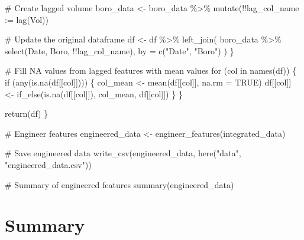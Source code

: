 \documentclass[
  letterpaper,
  DIV=11,
  numbers=noendperiod]{scrreprt}
\newenvironment{Shaded}{\begin{snugshade}}{\end{snugshade}}
\newcommand{\AttributeTok}[1]{\textcolor[rgb]{0.40,0.45,0.13}{#1}}
\newcommand{\CommentTok}[1]{\textcolor[rgb]{0.37,0.37,0.37}{#1}}
\newcommand{\ConstantTok}[1]{\textcolor[rgb]{0.56,0.35,0.01}{#1}}
\newcommand{\ControlFlowTok}[1]{\textcolor[rgb]{0.00,0.23,0.31}{#1}}
\newcommand{\FunctionTok}[1]{\textcolor[rgb]{0.28,0.35,0.67}{#1}}
\newcommand{\NormalTok}[1]{\textcolor[rgb]{0.00,0.23,0.31}{#1}}
\newcommand{\OtherTok}[1]{\textcolor[rgb]{0.00,0.23,0.31}{#1}}
\newcommand{\SpecialCharTok}[1]{\textcolor[rgb]{0.37,0.37,0.37}{#1}}
\newcommand{\StringTok}[1]{\textcolor[rgb]{0.13,0.47,0.30}{#1}}
\begin{document}
\begin{Shaded}
\begin{Highlighting}[]
    \CommentTok{\# Create lagged volume}
\NormalTok{    boro\_data }\OtherTok{\textless{}{-}}\NormalTok{ boro\_data }\SpecialCharTok{\%\textgreater{}\%}
      \FunctionTok{mutate}\NormalTok{(}\SpecialCharTok{!!}\AttributeTok{lag\_col\_name :=} \FunctionTok{lag}\NormalTok{(Vol))}
    
    \CommentTok{\# Update the original dataframe}
\NormalTok{    df }\OtherTok{\textless{}{-}}\NormalTok{ df }\SpecialCharTok{\%\textgreater{}\%}
      \FunctionTok{left\_join}\NormalTok{(}
\NormalTok{        boro\_data }\SpecialCharTok{\%\textgreater{}\%} \FunctionTok{select}\NormalTok{(Date, Boro, }\SpecialCharTok{!!}\NormalTok{lag\_col\_name),}
        \AttributeTok{by =} \FunctionTok{c}\NormalTok{(}\StringTok{"Date"}\NormalTok{, }\StringTok{"Boro"}\NormalTok{)}
\NormalTok{      )}
\NormalTok{  \}}
  
  \CommentTok{\# Fill NA values from lagged features with mean values}
  \ControlFlowTok{for}\NormalTok{ (col }\ControlFlowTok{in} \FunctionTok{names}\NormalTok{(df)) \{}
    \ControlFlowTok{if}\NormalTok{ (}\FunctionTok{any}\NormalTok{(}\FunctionTok{is.na}\NormalTok{(df[[col]]))) \{}
\NormalTok{      col\_mean }\OtherTok{\textless{}{-}} \FunctionTok{mean}\NormalTok{(df[[col]], }\AttributeTok{na.rm =} \ConstantTok{TRUE}\NormalTok{)}
\NormalTok{      df[[col]] }\OtherTok{\textless{}{-}} \FunctionTok{if\_else}\NormalTok{(}\FunctionTok{is.na}\NormalTok{(df[[col]]), col\_mean, df[[col]])}
\NormalTok{    \}}
\NormalTok{  \}}
  
  \FunctionTok{return}\NormalTok{(df)}
\NormalTok{\}}

\CommentTok{\# Engineer features}
\NormalTok{engineered\_data }\OtherTok{\textless{}{-}} \FunctionTok{engineer\_features}\NormalTok{(integrated\_data)}

\CommentTok{\# Save engineered data}
\FunctionTok{write\_csv}\NormalTok{(engineered\_data, }\FunctionTok{here}\NormalTok{(}\StringTok{"data"}\NormalTok{, }\StringTok{"engineered\_data.csv"}\NormalTok{))}

\CommentTok{\# Summary of engineered features}
\FunctionTok{summary}\NormalTok{(engineered\_data)}
\end{Highlighting}
\end{Shaded}

\section{Summary}\label{summary}
\end{document}
